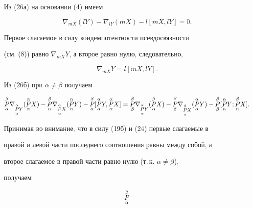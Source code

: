 \begin{pf} Из (26а) на основании (4) имеем


$$


\nabla_{mX}(lY)-\nabla_{lY}(mX)-l[mX,lY]=0.


$$


Первое слагаемое в силу коидемпотентности псевдосвязности


(см. (8)) равно $\nabla_{mX}Y$, а второе равно нулю, следовательно,


\begin{equation}


\nabla_{mX}Y=l[mX,lY].


\end{equation}


Из (26б) при $\alpha\ne\beta$ получаем


$$


\updown{\beta}{\alpha}{P}


\nabla_{\updown{\alpha}{\alpha}{P}Y}(\updown{\alpha}{\alpha}{P}X)-


\updown{\beta}{\alpha}{P}


\nabla_{\updown{\alpha}{\alpha}{P}X}(\updown{\alpha}{\alpha}{P}Y)-


\updown{\beta}{\alpha}{P}[\updown{\alpha}{\alpha}{P}Y,


\updown{\alpha}{\alpha}{P}X]=


\updown{\beta}{\beta}{P}


\nabla_{\updown{\alpha}{\alpha}{P}Y}


(\updown{\beta}{\alpha}{P}X)-


\updown{\beta}{\beta}{P}


\nabla_{\updown{\beta}{\alpha}{P}X}


(\updown{\alpha}{\alpha}{P}Y)-


\updown{\beta}{\beta}{P}[\updown{\alpha}{\alpha}{P}Y;


\updown{\beta}{\alpha}{P}X].


$$


Принимая во внимание, что в силу (19б) и (24) первые слагаемые в


правой и левой части последнего соотношения равны между собой, а


второе слагаемое в правой части равно нулю (т.\,к. $\alpha\ne\beta$),


получаем


\begin{equation}


\updown{\beta}{\alpha}{P}



\end{equation}
\end{pf}
